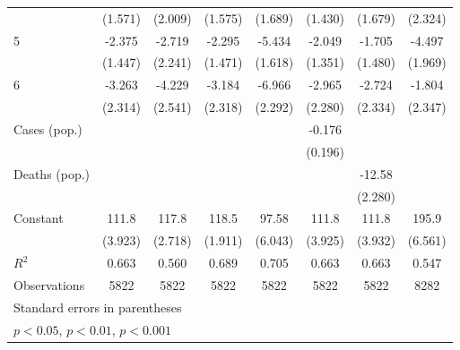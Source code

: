 \documentclass{article}
\begin{document}
{\begin{longtable}{l*{7}{c}}
                &  (1.571)         &  (2.009)         &  (1.575)         &  (1.689)         &  (1.430)         &  (1.679)         &  (2.324)         \\
5               &   -2.375         &   -2.719         &   -2.295         &   -5.434\sym{**} &   -2.049         &   -1.705         &   -4.497\sym{*}  \\
                &  (1.447)         &  (2.241)         &  (1.471)         &  (1.618)         &  (1.351)         &  (1.480)         &  (1.969)         \\
6               &   -3.263         &   -4.229         &   -3.184         &   -6.966\sym{**} &   -2.965         &   -2.724         &   -1.804         \\
                &  (2.314)         &  (2.541)         &  (2.318)         &  (2.292)         &  (2.280)         &  (2.334)         &  (2.347)         \\
Cases (pop.)    &                  &                  &                  &                  &   -0.176         &                  &                  \\
                &                  &                  &                  &                  &  (0.196)         &                  &                  \\
Deaths (pop.)   &                  &                  &                  &                  &                  &   -12.58\sym{***}&                  \\
                &                  &                  &                  &                  &                  &  (2.280)         &                  \\
Constant        &    111.8\sym{***}&    117.8\sym{***}&    118.5\sym{***}&    97.58\sym{***}&    111.8\sym{***}&    111.8\sym{***}&    195.9\sym{***}\\
                &  (3.923)         &  (2.718)         &  (1.911)         &  (6.043)         &  (3.925)         &  (3.932)         &  (6.561)         \\
\hline
\(R^{2}\)       &    0.663         &    0.560         &    0.689         &    0.705         &    0.663         &    0.663         &    0.547         \\
Observations    &     5822         &     5822         &     5822         &     5822         &     5822         &     5822         &     8282         \\
\hline\hline
\multicolumn{8}{l}{\footnotesize Standard errors in parentheses}\\
\multicolumn{8}{l}{\footnotesize \sym{*} \(p<0.05\), \sym{**} \(p<0.01\), \sym{***} \(p<0.001\)}\\
\end{longtable}
}
\end{document}
